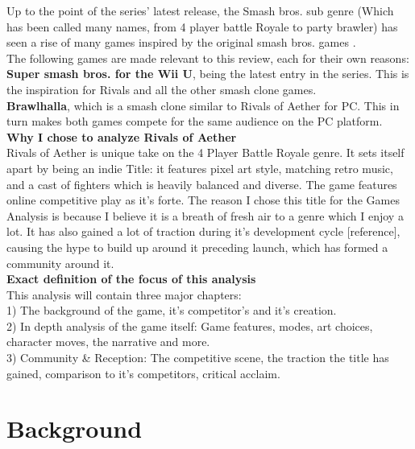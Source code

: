 \documentclass{article}
\begin{document}
Up to the point of the series' latest release, the Smash bros. sub genre (Which has been called many names, from 4 player battle Royale to party brawler) has seen a rise of many games inspired by the original smash bros. games \cite{lucassullivan2014:9}.\\
The following games are made relevant to this review, each for their own reasons:\\
\textbf{Super smash bros. for the Wii U}, being the latest entry in the series. This is the inspiration for Rivals and all the other smash clone games.\\
\textbf{Brawlhalla}, which is a smash clone similar to Rivals of Aether for PC. This in turn makes both games compete for the same audience on the PC platform.\\
\textbf{Why I chose to analyze Rivals of Aether}\\
Rivals of Aether is unique take on the 4 Player Battle Royale genre. It sets itself apart by being an indie Title: it features pixel art style, matching retro music, and a cast of fighters which is heavily balanced and diverse. The game features online competitive play as it's forte. The reason I chose this title for the Games Analysis is because I believe it is a breath of fresh air to a genre which I enjoy a lot. It has also gained a lot of traction during it's development cycle [reference], causing the hype to build up around it preceding launch, which has formed a community around it.\\

\textbf{Exact definition of the focus of this analysis}\\
This analysis will contain three major chapters:\\
1) The background of the game, it's competitor's and it's creation.\\
2) In depth analysis of the game itself: Game features, modes, art choices, character moves, the narrative and more.\\
3) Community & Reception: The competitive scene, the traction the title has gained, comparison to it's competitors, critical acclaim.\\

\newpage

\chapter{Background}\\
\end{document}
